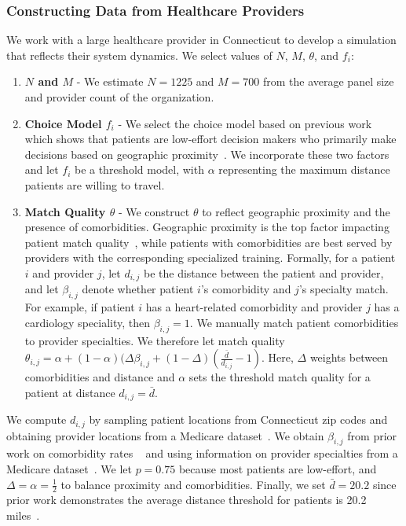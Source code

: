 \subsubsection{Constructing Data from Healthcare Providers}
\label{sec:semi_synthetic_data}
We work with a large healthcare provider in Connecticut to develop a simulation that reflects their system dynamics. 
We select values of $N$, $M$, $\theta$, and $f_{i}$: 
\begin{enumerate}
    \item \textbf{$N$ and $M$} - We estimate $N=1225$ and $M=700$ from the average panel size and provider count of the organization.
    \item \textbf{Choice Model $f_{i}$} - We select the choice model based on previous work which shows that patients are low-effort decision makers who primarily make decisions based on geographic proximity~\citep{choosing_doctor,distance_rural}.
    We incorporate these two factors and let $f_{i}$ be a threshold model, with $\alpha$ representing the maximum distance patients are willing to travel. 
    \item \textbf{Match Quality $\theta$} - We construct $\theta$ to reflect  geographic proximity and the presence of comorbidities. 
    Geographic proximity is the top factor impacting patient match quality~\citep{washington_distance,distance_rural}, while patients with comorbidities are best served by providers with the corresponding specialized training. 
    Formally, for a patient $i$ and provider $j$, let $d_{i,j}$ be the distance between the patient and provider, and let $\beta_{i,j}$ denote whether patient $i$'s comorbidity and $j$'s specialty match. 
    For example, if patient $i$ has a heart-related comorbidity and provider $j$ has a cardiology speciality, then $\beta_{i,j}=1$. 
    We manually match patient comorbidities to provider specialties. 
    We therefore let match quality $\theta_{i,j} = \alpha + (1-\alpha)(\Delta \beta_{i,j} + (1-\Delta)(\frac{\bar{d}}{d_{i,j}}-1)$. 
    Here, $\Delta$ weights between comorbidities and distance and $\alpha$ sets the threshold match quality for a patient at distance $d_{i,j}=\bar{d}$.  
\end{enumerate}
We compute $d_{i,j}$ by sampling patient locations from Connecticut zip codes and obtaining provider locations from a Medicare dataset~\citep{Medicare}. 
We obtain $\beta_{i,j}$ from prior work on comorbidity rates ~\citep{age_comorbidity} and using information on provider specialties from a Medicare dataset~\citep{Medicare}. 
We let $p=0.75$ because most patients are low-effort, and $\Delta=\alpha=\frac{1}{2}$ to balance proximity and comorbidities. Finally, we set $\bar{d}=20.2$ since prior work demonstrates the average distance threshold for patients is 20.2 miles~\citep{washington_distance}. 

